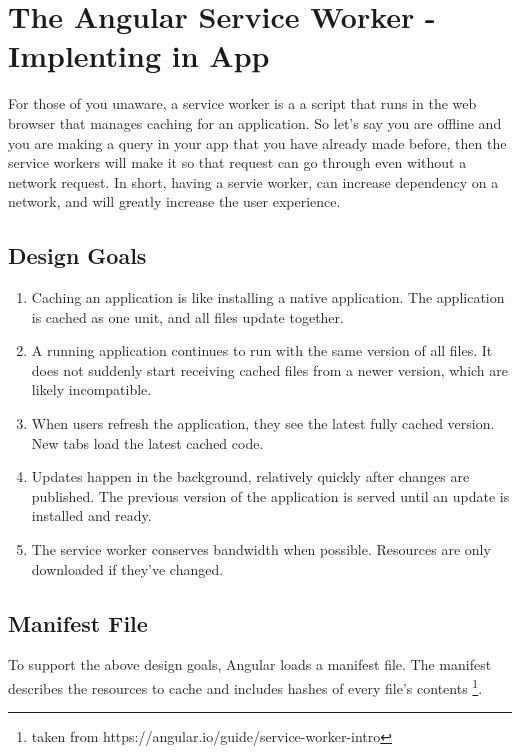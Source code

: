 \maketitle{}
\section{ The Angular Service Worker - Implenting in App }

For those of you unaware, a service worker is a a script that runs in the web
browser that manages caching for an application. So let's say you are offline
and you are making a query in your app that you have already made before, then
the service workers will make it so that request can go through even without a
network request. In short, having a servie worker, can increase dependency on a
network, and will greatly increase the user experience.

\subsection{ Design Goals }
\begin{enumerate}
  \item Caching an application is like installing a native application.
  The application is cached as one unit, and all files update together.
  \item A running application continues to run with the same version of all
  files. It does not suddenly start receiving cached files from a newer version,
  which are likely incompatible.
  \item When users refresh the application, they see the latest fully cached
  version. New tabs load the latest cached code.
  \item Updates happen in the background, relatively quickly after changes are
  published. The previous version of the application is served until an update
  is installed and ready.
  \item The service worker conserves bandwidth when possible. Resources are only
  downloaded if they've changed.
\end{enumerate}

\subsection{ Manifest File }
To support the above design goals, Angular loads a manifest file. The manifest
describes the resources to cache and includes hashes of every file's contents
\footnote{taken from https://angular.io/guide/service-worker-intro}.

